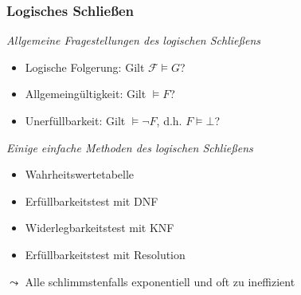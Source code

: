 \documentclass[onlymath]{beamer}
\begin{document}
\maketitle


\begin{frame}\frametitle{Logisches Schließen}

\emph{Allgemeine Fragestellungen des logischen Schließens}
\begin{itemize}
\item Logische Folgerung: Gilt $\mathcal{F}\models G$?
\item Allgemeingültigkeit: Gilt $\models F$?
\item Unerfüllbarkeit: Gilt $\models \neg F$, d.h. $F\models\bot$?
\end{itemize}\bigskip

\emph{Einige einfache Methoden des logischen Schließens}
\begin{itemize}
\item Wahrheitswertetabelle
\item Erfüllbarkeitstest mit DNF
\item Widerlegbarkeitstest mit KNF
\item Erfüllbarkeitstest mit Resolution
\end{itemize}
$\leadsto$ Alle schlimmstenfalls exponentiell und oft zu ineffizient

\end{frame}

\end{document}
